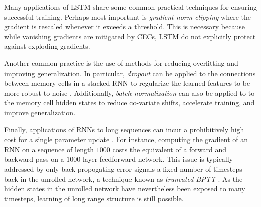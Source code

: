 Many applications of LSTM
\citep{devlin2014fast,zaremba2015empirical,pascanu2013construct} share some
common practical techniques for ensuring successful training. Perhaps most
important is \emph{gradient norm clipping} \citep{Mikolov2012,Pascanu2012}
where the gradient is rescaled whenever it exceeds a threshold. This is
necessary because while vanishing gradients are mitigated by CECs, LSTM do not
explicitly protect against exploding gradients.

Another common practice is the use of methods for reducing overfitting and
improving generalization. In particular, \emph{dropout}
\citep{srivastava2014dropout} can be applied to the connections between memory
cells in a stacked RNN to regularize the learned features to be more robust to
noise \citep{zaremba2014recurrent}. Additionally, \emph{batch normalization}
\citep{ioffe2015batch} can also be applied to to the memory cell hidden states
to reduce co-variate shifts, accelerate training, and improve generalization.

Finally, applications of RNNs to long sequences can incur a prohibitively high
cost for a single parameter update \citep{citeulike:13881859}. For instance,
computing the gradient of an RNN on a sequence of length $1000$ costs the
equivalent of a forward and backward pass on a $1000$ layer feedforward
network. This issue is typically addressed by only back-propogating error
signals a fixed number of timesteps back in the unrolled network, a technique
known as \emph{truncated BPTT} \citep{williams1990efficient}. As the hidden
states in the unrolled network have nevertheless been exposed to many
timesteps, learning of long range structure is still possible.
